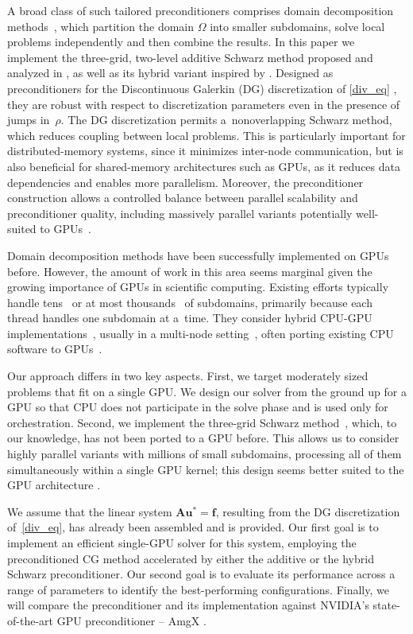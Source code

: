 \documentclass[11pt]{article}
\theoremstyle{definition}
\theoremstyle{theorem}
\begin{document}
A broad class of such tailored preconditioners comprises domain decomposition
methods~\cite{toselli}, which partition the domain $\Omega$ into smaller subdomains,
solve local problems independently and then combine the results. In this paper we
implement the three-grid, two-level additive Schwarz method proposed and
analyzed in \cite{Przykry, Przykry-hp}, as well as its hybrid variant
inspired by \cite{toselli}. Designed as preconditioners for the Discontinuous Galerkin
(DG) discretization of \eqref{div_eq} \cite{Ern-dg,Ern-weighted-dg}, they are robust
with respect to discretization parameters even in the presence of jumps in~$\rho$.
The DG discretization permits a~nonoverlapping Schwarz method, which reduces coupling between
local problems. This is particularly important for distributed-memory systems,
since it minimizes inter-node communication, but is also beneficial
for shared-memory architectures such as GPUs, as it reduces data dependencies
and enables more parallelism. Moreover, the preconditioner
construction allows a controlled balance between parallel scalability and
preconditioner quality, including massively parallel variants potentially
well-suited to GPUs~\cite{cuda-guide}.

Domain decomposition methods have been successfully implemented on
GPUs before. However, the amount of
work in this area seems marginal given the growing importance of GPUs in
scientific computing. Existing efforts typically handle
tens~\cite{Yamazaki,Sistek} or at most thousands~\cite{Papadrakakis} of subdomains,
primarily because each thread handles one subdomain at a~time.
They consider hybrid CPU-GPU implementations~\cite{Yamazaki, Sistek, Papadrakakis},
usually in a multi-node setting~\cite{Yamazaki,Sistek}, often porting
existing CPU software to GPUs~\cite{Yamazaki}.

Our approach differs in two key aspects. First, we target moderately sized problems
that fit on a single GPU. We design our solver from the ground up for a GPU
so that CPU does not participate in the solve phase and is used only for
orchestration. Second, we implement the three-grid Schwarz method~\cite{Przykry, Przykry-hp},
which, to our knowledge, has not been ported to a GPU before. This allows
us to consider highly parallel variants with millions of small subdomains,
processing all of them simultaneously within a single GPU kernel; this design seems
better suited to the GPU architecture \cite{cuda-guide}.

We assume that the linear system $\bm{A} \bm{u^*} = \bm{f}$, resulting from the
DG discretization of~\eqref{div_eq}, has already been assembled and is provided.
Our first goal is to implement an efficient single\nobreakdash-GPU solver for this system,
employing the preconditioned CG method accelerated by either the additive or the hybrid Schwarz preconditioner.
Our second goal is to evaluate its performance across a range of parameters
to identify the best-performing configurations.
Finally, we will compare the preconditioner and its implementation
against NVIDIA's state-of-the-art GPU preconditioner -- AmgX \cite{amgx}.
\end{document}
